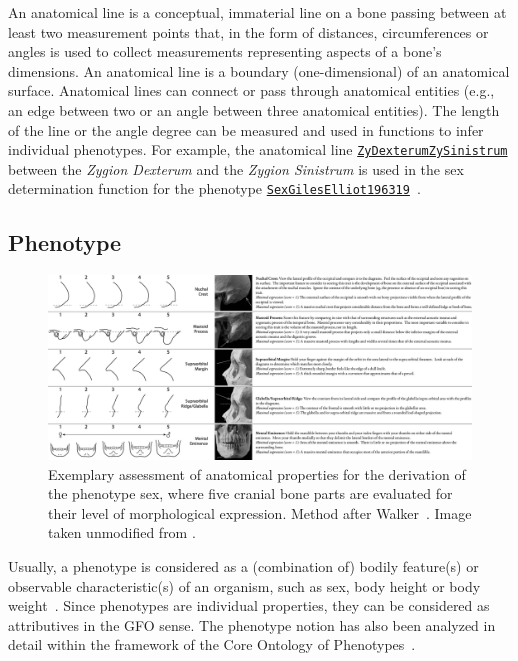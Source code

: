 \documentclass[sw]{iosart2x}
\newcommand{\anno}[1]{\href{https://annosaxfdm.de/ontology/#1}{\texttt{#1}}}
\begin{document}
An anatomical line is a conceptual, immaterial line on a bone passing between at least two measurement points that, in the form of distances, circumferences or angles is used to collect measurements representing aspects of a bone's dimensions.
An anatomical line is a boundary (one-dimensional) of an anatomical surface.
Anatomical lines can connect or pass through anatomical entities (e.g., an edge between two or an angle between three anatomical entities).
The length of the line or the angle degree can be measured and used in functions to infer individual phenotypes.%
For example, the anatomical line \anno{ZyDexterumZySinistrum} between the \emph{Zygion Dexterum} and the \emph{Zygion Sinistrum} is used in the sex determination function for the phenotype \anno{SexGilesElliot196319}~\citep{sexgileselliot1963}.

\subsection{Phenotype}
\begin{figure}[h]
\includegraphics[width=\textwidth]{img/phenotype.png}
\caption{
Exemplary assessment of anatomical properties for the derivation of the phenotype sex, where five cranial bone parts are evaluated for their level of morphological expression.
Method after Walker~\cite{datacollection}.
Image taken unmodified from \cite{datacollection}.
}\label{fig:phenotype}
\end{figure}


Usually, a phenotype is considered as a (combination of) bodily feature(s) or observable characteristic(s) of an organism, such as sex, body height or body weight~\citep{ontologicaltreatment,phenomes,interoperability}.
Since phenotypes are individual properties, they can be considered as attributives in the GFO sense.
The phenotype notion has also been analyzed in detail within the framework of the Core Ontology of Phenotypes~\citep{ontologicalrepresentation}.
\end{document}
